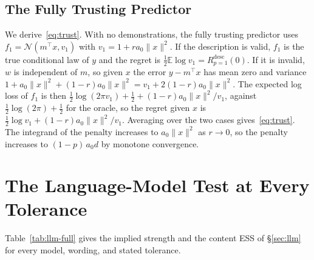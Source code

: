 \documentclass[10pt]{article}
\newcommand{\E}{\mathbb{E}}
\begin{document}
\subsection{The Fully Trusting Predictor}\label{app:trust}
We derive~\eqref{eq:trust}. With no demonstrations, the fully trusting predictor uses $f_1 = \mathcal{N}(m^\top x, v_1)$ with $v_1 = 1 + r a_0 \|x\|^2$. If the description is valid, $f_1$ is the true conditional law of $y$ and the regret is $\tfrac12 \E \log v_1 = R^{\mathrm{desc}}_{p=1}(0)$. If it is invalid, $w$ is independent of $m$, so given $x$ the error $y - m^\top x$ has mean zero and variance $1 + a_0\|x\|^2 + (1-r)a_0\|x\|^2 = v_1 + 2(1-r)a_0\|x\|^2$. The expected log loss of $f_1$ is then $\tfrac12 \log(2\pi v_1) + \tfrac12 + (1-r)a_0\|x\|^2/v_1$, against $\tfrac12 \log(2\pi) + \tfrac12$ for the oracle, so the regret given $x$ is $\tfrac12 \log v_1 + (1-r)a_0\|x\|^2/v_1$. Averaging over the two cases gives~\eqref{eq:trust}. The integrand of the penalty increases to $a_0\|x\|^2$ as $r \to 0$, so the penalty increases to $(1-p)\,a_0 d$ by monotone convergence.

\section{The Language-Model Test at Every Tolerance}\label{app:llm}
Table~\ref{tab:llm-full} gives the implied strength and the content ESS of \S\ref{sec:llm} for every model, wording, and stated tolerance.

\begin{table}[t]
\centering\small
\setlength{\tabcolsep}{4pt}
\caption{Implied strength of a valid and an invalid line, and content ESS of a valid line over the number tokens and with the full next-token loss, for every model, wording, and stated tolerance ($2{,}000$ tasks, $n = 5, \dots, 10$).}
\label{tab:llm-full}

\end{table}
\end{document}
